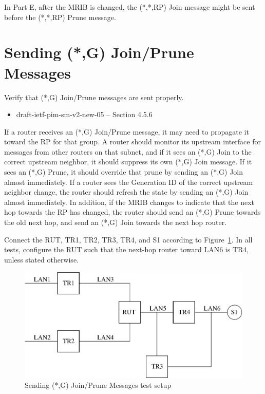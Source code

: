 \documentclass[11pt]{report}
\begin{document}
In Part E, after the MRIB is changed, the (*,*,RP) Join message might
be sent before the (*,*,RP) Prune message.

\newpage
\section{Sending (*,G) Join/Prune Messages}

Verify that (*,G) Join/Prune messages are sent properly.

\begin{itemize}
  \item draft-ietf-pim-sm-v2-new-05 -- Section 4.5.6
\end{itemize}

If a router receives an (*,G) Join/Prune message, it may need to propagate
it toward the RP for that group. A router should monitor its upstream
interface for messages
from other routers on that subnet, and if it sees an (*,G) Join to the
correct upstream neighbor, it should suppress its own (*,G) Join message.
If it sees an (*,G) Prune, it should override that prune by sending an
(*,G) Join almost immediately. If a router sees the Generation ID of the
correct upstream neighbor change, the router should refresh the state by
sending an (*,G) Join almost immediately. In addition, if the MRIB changes
to indicate that the next hop towards the RP has changed, the router should
send an (*,G) Prune towards the old next hop, and send an (*,G) Join
towards the next hop router.

Connect the RUT, TR1, TR2, TR3, TR4, and S1 according to
Figure~\ref{fig:pim_test_4_6_sending_wc_join_prune_messages}.
In all tests, configure the RUT such that the next-hop router toward LAN6 is
TR4, unless stated otherwise.

\begin{figure}[htbp]
  \begin{center}
    \includegraphics[scale=0.8]{figs/pim_test_4_6_sending_wc_join_prune_messages}
    \caption{Sending (*,G) Join/Prune Messages test setup}
    \label{fig:pim_test_4_6_sending_wc_join_prune_messages}
  \end{center}
\end{figure}
\end{document}
